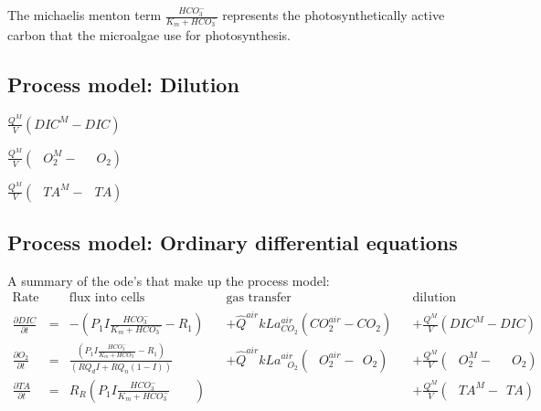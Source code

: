 \documentclass{ruthesis}
\begin{document}
The michaelis menton term $ \frac{HCO_3^-}{K_m + HCO_3^-} $ represents the photosynthetically active carbon that the microalgae use for photosynthesis. 

\subsection{Process model: Dilution}

$ \frac{Q^M}{V}(DIC^{M} - DIC) $

$ \frac{Q^M}{V}(\phantom{C}O_{2}^{M} - \phantom{CC}O_{2}) $

$ \frac{Q^M}{V}(\phantom{C}TA^{M} - \phantom{C}TA) $




\subsection{Process model: Ordinary differential equations}

A summary of the ode's that make up the process model:
\begin{align}
\text{Rate} & & \text{flux into cells}            &            &\text{gas transfer}   &     & \text{dilution} \nonumber                              \\
\frac{\partial DIC}{\partial t}&=&                      - (P_1 I \frac{HCO_3^-}{K_m + HCO_3^-} - R_1)&      &+\hat Q^{air}kLa_{ CO_2}^{air}(CO_{2}^{air} - CO_{2})                  & &+\frac{Q^M}{V}(DIC^{M} - DIC)       \nonumber \\
\frac{\partial O_2}{\partial t}&=& \frac{(P_1 I \frac{HCO_3^-}{K_m + HCO_3^-} - R_1)}{(RQ_d I + RQ_n(1-I))}  &      &+\hat Q^{air}kLa_{\phantom{C}O_2}^{air}(\phantom{C}O_{2}^{air} - \phantom{I}O_{2}) && +\frac{Q^M}{V}(\phantom{C}O_{2}^{M} - \phantom{CC}O_{2})     \nonumber   \\
\frac{\partial TA}{\partial t} & =&      R_R (P_1 I \frac{HCO_3^-}{K_m + HCO_3^-} \phantom{ + R_1})& & & & +\frac{Q^M}{V}(\phantom{C}TA^{M} - \phantom{I}TA)
\end{align}
\end{document}
